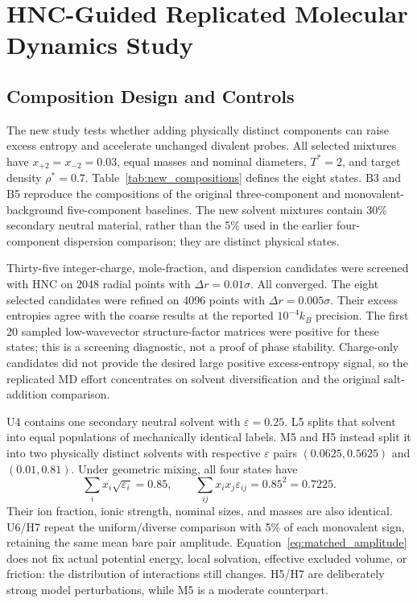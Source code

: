 \section{HNC-Guided Replicated Molecular Dynamics Study}
\label{sec:new_study}

\subsection{Composition Design and Controls}

The new study tests whether adding physically distinct components can raise excess entropy and accelerate unchanged divalent probes. All selected mixtures have $x_{+2}=x_{-2}=0.03$, equal masses and nominal diameters, $T^*=2$, and target density $\rho^*=0.7$. Table~\ref{tab:new_compositions} defines the eight states. B3 and B5 reproduce the compositions of the original three-component and monovalent-background five-component baselines. The new solvent mixtures contain 30\% secondary neutral material, rather than the 5\% used in the earlier four-component dispersion comparison; they are distinct physical states.



Thirty-five integer-charge, mole-fraction, and dispersion candidates were screened with HNC on 2048 radial points with $\Delta r=0.01\sigma$. All converged. The eight selected candidates were refined on 4096 points with $\Delta r=0.005\sigma$. Their excess entropies agree with the coarse results at the reported $10^{-4}k_B$ precision. The first 20 sampled low-wavevector structure-factor matrices were positive for these states; this is a screening diagnostic, not a proof of phase stability. Charge-only candidates did not provide the desired large positive excess-entropy signal, so the replicated MD effort concentrates on solvent diversification and the original salt-addition comparison.

U4 contains one secondary neutral solvent with $\varepsilon=0.25$. L5 splits that solvent into equal populations of mechanically identical labels. M5 and H5 instead split it into two physically distinct solvents with respective $\varepsilon$ pairs $(0.0625,0.5625)$ and $(0.01,0.81)$. Under geometric mixing, all four states have
\begin{equation}
\sum_i x_i\sqrt{\varepsilon_i}=0.85,\qquad
\sum_{ij}x_ix_j\varepsilon_{ij}=0.85^2=0.7225.
\label{eq:matched_amplitude}
\end{equation}
Their ion fraction, ionic strength, nominal sizes, and masses are also identical. U6/H7 repeat the uniform/diverse comparison with 5\% of each monovalent sign, retaining the same mean bare pair amplitude. Equation~\eqref{eq:matched_amplitude} does not fix actual potential energy, local solvation, effective excluded volume, or friction: the distribution of interactions still changes. H5/H7 are deliberately strong model perturbations, while M5 is a moderate counterpart.

